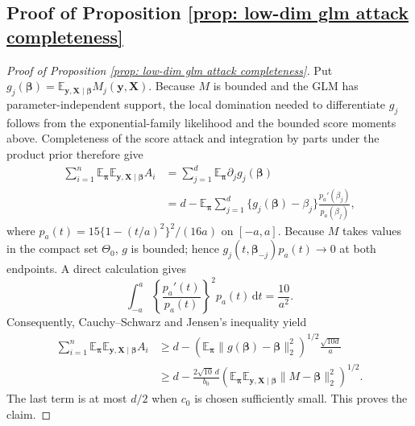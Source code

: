 \documentclass[letterpaper,12pt]{article}
\renewcommand{\d}{\mathrm{d}}
\numberwithin{equation}{section}
\theoremstyle{plain}
\numberwithin{Theorem}{section}
\numberwithin{proposition}{section}
\numberwithin{Lemma}{section}
{
	\theoremstyle{definition}
	\newtheorem{Definition}{Definition}
	\newtheorem{example}{Example}
	\numberwithin{example}{section}
	\newtheorem{fact}{Fact}
	\numberwithin{fact}{section}
	\newtheorem{remark}{Remark}
}
\newcommand{\1}{\mathbbm{1}}
\def\bbeta{{\boldsymbol{\beta}}}
\def\E{\mathbb{E}}
\begin{document}
\subsection{Proof of Proposition \ref{prop: low-dim glm attack completeness}}\label{sec: proof of prop: low-dim glm attack completeness}
\begin{proof}[Proof of Proposition \ref{prop: low-dim glm attack completeness}]
		{Put $g_j(\bbeta)=\E_{\bm y,\bm X\mid\bbeta}M_j(\bm y,\bm X)$. Because $M$ is bounded and the GLM has parameter-independent support, the local domination needed to differentiate $g_j$ follows from the exponential-family likelihood and the bounded score moments above. Completeness of the score attack and integration by parts under the product prior therefore give
	\begin{align*}
		\sum_{i=1}^n\E_{\bm\pi}\E_{\bm y,\bm X\mid\bbeta}A_i
	&=\sum_{j=1}^d\E_{\bm\pi}\partial_j g_j(\bbeta)\\
	&=d-\E_{\bm\pi}\sum_{j=1}^d\{g_j(\bbeta)-\beta_j\}\frac{p_a'(\beta_j)}{p_a(\beta_j)},
	\end{align*}
		where $p_a(t)=15\{1-(t/a)^2\}^2/(16a)$ on $[-a,a]$. Because $M$ takes values in the compact set $\Theta_0$, $g$ is bounded; hence $g_j(t,\bbeta_{-j})p_a(t)\to0$ at both endpoints. A direct calculation gives
	\[
	\int_{-a}^a\left\{\frac{p_a'(t)}{p_a(t)}\right\}^2p_a(t)\,\d t=\frac{10}{a^2}.
	\]
	Consequently, Cauchy--Schwarz and Jensen's inequality yield
	\begin{align*}
		\sum_{i=1}^n\E_{\bm\pi}\E_{\bm y,\bm X\mid\bbeta}A_i
	&\geq d-\left(\E_{\bm\pi}\|g(\bbeta)-\bbeta\|_2^2\right)^{1/2}\frac{\sqrt{10d}}a\\
	&\geq d-\frac{2\sqrt{10}\,d}{b_0}
		\left(\E_{\bm\pi}\E_{\bm y,\bm X\mid\bbeta}\|M-\bbeta\|_2^2\right)^{1/2}.
	\end{align*}
	The last term is at most $d/2$ when $c_0$ is chosen sufficiently small. This proves the claim.}
\end{proof}
\end{document}
